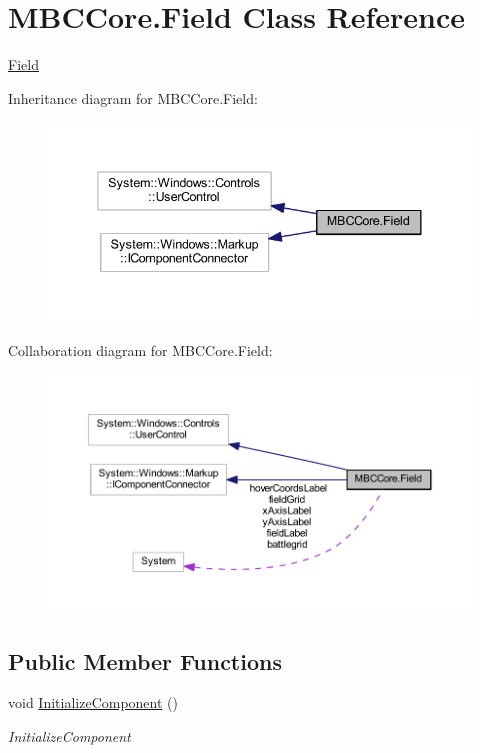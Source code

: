 \hypertarget{class_m_b_c_core_1_1_field}{\section{M\-B\-C\-Core.\-Field Class Reference}
\label{class_m_b_c_core_1_1_field}
}


\hyperlink{class_m_b_c_core_1_1_field}{Field}  




Inheritance diagram for M\-B\-C\-Core.\-Field\-:
\nopagebreak
\begin{figure}[H]
\begin{center}
\leavevmode
\includegraphics[width=338pt]{class_m_b_c_core_1_1_field__inherit__graph}
\end{center}
\end{figure}


Collaboration diagram for M\-B\-C\-Core.\-Field\-:
\nopagebreak
\begin{figure}[H]
\begin{center}
\leavevmode
\includegraphics[width=350pt]{class_m_b_c_core_1_1_field__coll__graph}
\end{center}
\end{figure}
\subsection*{Public Member Functions}
\begin{DoxyCompactItemize}
\item 
void \hyperlink{class_m_b_c_core_1_1_field_a6ccc6167cd9ad5044d035b9b57b1e763}{Initialize\-Component} ()
\begin{DoxyCompactList}\small\item\em Initialize\-Component \end{DoxyCompactList}\end{DoxyCompactItemize}


